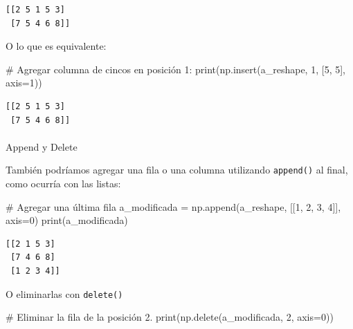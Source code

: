 \documentclass[
  letterpaper,
  DIV=11,
  numbers=noendperiod]{scrreprt}
\makeatletter
\let\oldparagraph\paragraph
\renewcommand{\paragraph}{
    \@ifstar
      \xxxParagraphStar
      \xxxParagraphNoStar
  }
\newcommand{\xxxParagraphStar}[1]{\oldparagraph*{#1}\mbox{}}
\newcommand{\xxxParagraphNoStar}[1]{\oldparagraph{#1}\mbox{}}
\newenvironment{Shaded}{\begin{snugshade}}{\end{snugshade}}
\newcommand{\BuiltInTok}[1]{\textcolor[rgb]{0.00,0.23,0.31}{#1}}
\newcommand{\CommentTok}[1]{\textcolor[rgb]{0.37,0.37,0.37}{#1}}
\newcommand{\DecValTok}[1]{\textcolor[rgb]{0.68,0.00,0.00}{#1}}
\newcommand{\NormalTok}[1]{\textcolor[rgb]{0.00,0.23,0.31}{#1}}
\newcommand{\OperatorTok}[1]{\textcolor[rgb]{0.37,0.37,0.37}{#1}}
\makeatother
\begin{document}
\begin{verbatim}
[[2 5 1 5 3]
 [7 5 4 6 8]]
\end{verbatim}

O lo que es equivalente:

\begin{Shaded}
\begin{Highlighting}[]
\CommentTok{\# Agregar columna de cincos en posición 1:}
\BuiltInTok{print}\NormalTok{(np.insert(a\_reshape, }\DecValTok{1}\NormalTok{, [}\DecValTok{5}\NormalTok{, }\DecValTok{5}\NormalTok{], axis}\OperatorTok{=}\DecValTok{1}\NormalTok{))}
\end{Highlighting}
\end{Shaded}

\begin{verbatim}
[[2 5 1 5 3]
 [7 5 4 6 8]]
\end{verbatim}

\paragraph{Append y Delete}\label{append-y-delete}

También podríamos agregar una fila o una columna utilizando
\texttt{append()} al final, como ocurría con las listas:

\begin{Shaded}
\begin{Highlighting}[]
\CommentTok{\# Agregar una última fila}
\NormalTok{a\_modificada }\OperatorTok{=}\NormalTok{ np.append(a\_reshape, [[}\DecValTok{1}\NormalTok{, }\DecValTok{2}\NormalTok{, }\DecValTok{3}\NormalTok{, }\DecValTok{4}\NormalTok{]], axis}\OperatorTok{=}\DecValTok{0}\NormalTok{)}
\BuiltInTok{print}\NormalTok{(a\_modificada)}
\end{Highlighting}
\end{Shaded}

\begin{verbatim}
[[2 1 5 3]
 [7 4 6 8]
 [1 2 3 4]]
\end{verbatim}

O eliminarlas con \texttt{delete()}

\begin{Shaded}
\begin{Highlighting}[]
\CommentTok{\# Eliminar la fila de la posición 2.}
\BuiltInTok{print}\NormalTok{(np.delete(a\_modificada, }\DecValTok{2}\NormalTok{, axis}\OperatorTok{=}\DecValTok{0}\NormalTok{))}
\end{Highlighting}
\end{Shaded}
\end{document}

